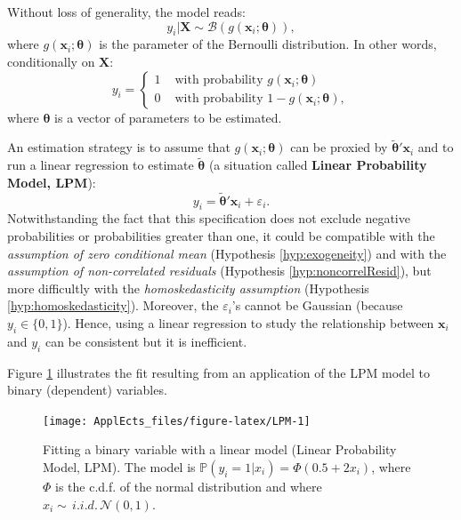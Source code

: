 \documentclass[
  12pt,
]{book}
\theoremstyle{definition}
\theoremstyle{definition}
\theoremstyle{definition}
\theoremstyle{definition}
\theoremstyle{remark}
\begin{document}
Without loss of generality, the model reads:
\begin{equation}\label{eq:binaryBenroulli}
y_i | \mathbf{X} \sim \mathcal{B}(g(\mathbf{x}_i;\boldsymbol\theta)),
\end{equation}
where \(g(\mathbf{x}_i;\boldsymbol\theta)\) is the parameter of the Bernoulli distribution. In other words, conditionally on \(\mathbf{X}\):
\begin{equation}
y_i = \left\{
\begin{array}{cl}
1 & \mbox{ with probability } g(\mathbf{x}_i;\boldsymbol\theta)\\
0 & \mbox{ with probability } 1-g(\mathbf{x}_i;\boldsymbol\theta),
\end{array}
\right.\label{eq:genericBinary}
\end{equation}
where \(\boldsymbol\theta\) is a vector of parameters to be estimated.

An estimation strategy is to assume that \(g(\mathbf{x}_i;\boldsymbol\theta)\) can be proxied by \(\tilde{\boldsymbol\theta}'\mathbf{x}_i\) and to run a linear regression to estimate \(\tilde{\boldsymbol\theta}\) (a situation called \textbf{Linear Probability Model, LPM}):
\[
y_i = \tilde{\boldsymbol\theta}'\mathbf{x}_i + \varepsilon_i.
\]
Notwithstanding the fact that this specification does not exclude negative probabilities or probabilities greater than one, it could be compatible with the \emph{assumption of zero conditional mean} (Hypothesis \ref{hyp:exogeneity}) and with the \emph{assumption of non-correlated residuals} (Hypothesis \ref{hyp:noncorrelResid}), but more difficultly with the \emph{homoskedasticity assumption} (Hypothesis \ref{hyp:homoskedasticity}). Moreover, the \(\varepsilon_i\)'s cannot be Gaussian (because \(y_i \in \{0,1\}\)). Hence, using a linear regression to study the relationship between \(\mathbf{x}_i\) and \(y_i\) can be consistent but it is inefficient.

Figure \ref{fig:LPM} illustrates the fit resulting from an application of the LPM model to binary (dependent) variables.

\begin{figure}
\texttt{[image: ApplEcts\_files/figure-latex/LPM-1]} \caption{Fitting a binary variable with a linear model (Linear Probability Model, LPM). The model is $\mathbb{P}(y_i=1|x_i)=\Phi(0.5+2x_i)$, where $\Phi$ is the c.d.f. of the normal distribution and where $x_i \sim \,i.i.d.\,\mathcal{N}(0,1)$.}\label{fig:LPM}
\end{figure}
\end{document}
